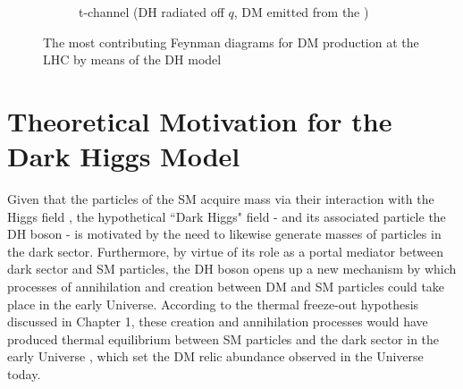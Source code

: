\begin{figure}[hp]
\begin{subfigure}[t]{.42\textwidth}
%
%
%
%
	\caption{t-channel (DH radiated off \(q\), DM emitted from the \Zprime)}
	\end{subfigure}
	\caption{The most contributing Feynman diagrams for DM production at the LHC by means of the DH model}
	\label{fig:Feynman_DH}
\end{figure}


\section{Theoretical Motivation for the Dark Higgs Model}

Given that the particles of the SM acquire mass via their interaction with the Higgs field \cite{HiggsTheory1,HiggsTheory2,HiggsTheory3}, the hypothetical ``Dark Higgs" field - and its associated particle the DH boson - is motivated by the need to likewise generate masses of particles in the dark sector. Furthermore, by virtue of its role as a portal mediator between dark sector and SM particles, the DH boson opens up a new mechanism by which processes of annihilation and creation between DM and SM particles could take place in the early Universe. According to the thermal freeze-out hypothesis discussed in Chapter 1, these creation and annihilation processes would have produced thermal equilibrium between SM particles and the dark sector in the early Universe \cite{DM_earlyUniverse}, which set the DM relic abundance observed in the Universe today. 

